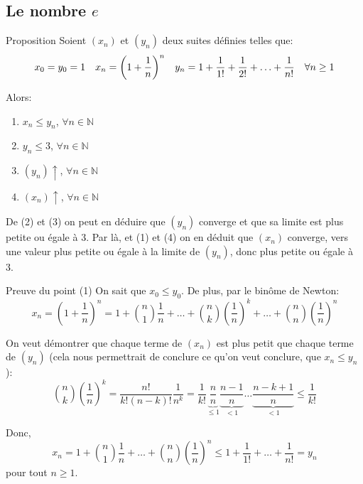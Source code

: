 \documentclass[a4paper]{article}
\begin{document}
\subsection{Le nombre $e$}
\begin{parag}{Proposition}
    Soient $\left(x_n\right)$ et $\left(y_n\right)$ deux suites définies telles que:
    \[x_0 = y_0 = 1 \mathspace x_n = \left(1 + \frac{1}{n}\right)^n \mathspace y_n = 1 + \frac{1}{1!} + \frac{1}{2!} + \ldots + \frac{1}{n!} \mathspace \forall n \geq 1\]

    Alors:
    \begin{enumerate}
        \item $x_n \leq y_n$, $\forall n \in \mathbb{N}$
        \item $y_n \leq 3$, $\forall n \in \mathbb{N}$
        \item $\left(y_n\right)\uparrow$, $\forall n \in \mathbb{N}$
        \item $\left(x_n\right)\uparrow$, $\forall n \in \mathbb{N}$
    \end{enumerate}

    De (2) et (3) on peut en déduire que $\left(y_n\right)$ converge et que sa limite est plus petite ou égale à 3. Par là, et (1) et (4) on en déduit que $\left(x_n\right)$ converge, vers une valeur plus petite ou égale à la limite de $\left(y_n\right)$, donc plus petite ou égale à 3.

    \begin{subparag}{Preuve du point (1)}
        On sait que $x_0 \leq y_0$. De plus, par le binôme de Newton:
        \[x_n = \left(1 + \frac{1}{n}\right)^{n} = 1 + \binom{n}{1} \frac{1}{n} + \ldots + \binom{n}{k} \left(\frac{1}{n}\right)^{k} + \ldots + \binom{n}{n} \left(\frac{1}{n}\right)^{n}\]

        On veut démontrer que chaque terme de $\left(x_n\right)$ est plus petit que chaque terme de $\left(y_n\right)$ (cela nous permettrait de conclure ce qu'on veut conclure, que $x_n \leq y_n$):
        \[\binom{n}{k} \left(\frac{1}{n}\right)^{k} = \frac{n!}{k! \left(n-k\right)!} \frac{1}{n^{k}} = \frac{1}{k!} \underbrace{\frac{n}{n}}_{\leq1} \underbrace{\frac{n-1}{n}}_{<1} \ldots \underbrace{\frac{n - k + 1}{n}}_{< 1} \leq \frac{1}{k!}\]

        Donc,
        \[x_n = 1 + \binom{n}{1} \frac{1}{n} + \ldots + \binom{n}{n} \left(\frac{1}{n}\right)^{n} \leq 1 + \frac{1}{1!} + \ldots + \frac{1}{n!} = y_n\]
        pour tout $n \geq 1$.
    \end{subparag}


\end{parag}
\end{document}
